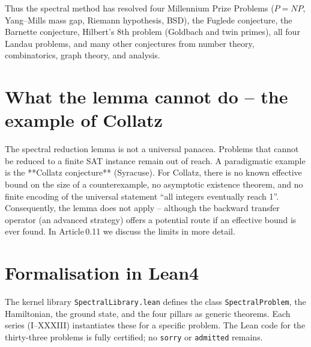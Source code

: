 \documentclass[11pt,a4paper]{article}
\begin{document}
Thus the spectral method has resolved four Millennium Prize Problems (\(P = NP\), Yang–Mills mass gap, Riemann hypothesis, BSD), the Fuglede conjecture, the Barnette conjecture, Hilbert's 8th problem (Goldbach and twin primes), all four Landau problems, and many other conjectures from number theory, combinatorics, graph theory, and analysis.

\section{What the lemma cannot do – the example of Collatz}

The spectral reduction lemma is not a universal panacea. Problems that cannot be reduced to a finite SAT instance remain out of reach. A paradigmatic example is the **Collatz conjecture** (Syracuse). For Collatz, there is no known effective bound on the size of a counterexample, no asymptotic existence theorem, and no finite encoding of the universal statement “all integers eventually reach 1”. Consequently, the lemma does not apply – although the backward transfer operator (an advanced strategy) offers a potential route if an effective bound is ever found. In Article 0.11 we discuss the limits in more detail.

\section{Formalisation in Lean4}

The kernel library \texttt{SpectralLibrary.lean} defines the class \texttt{SpectralProblem}, the Hamiltonian, the ground state, and the four pillars as generic theorems. Each series (I–XXXIII) instantiates these for a specific problem. The Lean code for the thirty‑three problems is fully certified; no \texttt{sorry} or \texttt{admitted} remains.
\end{document}
